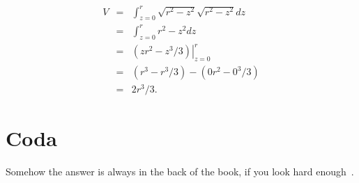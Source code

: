 \documentclass[twocolumn]{article}
\theoremstyle{definition}
\theoremstyle{plain}
\begin{document}
\begin{eqnarray*}
  V & = & \int_{z=0}^r \sqrt{r^2 - z^2} \sqrt{r^2 - z^2} dz \\
  & = & \int_{z=0}^r r^2 - z^2 dz \\
  & = & \left. (zr^2 - z^3/3) \right|_{z=0}^r \\
  & = & (r^3 - r^3/3) - (0r^2 - 0^3/3) \\
  & = & 2r^3/3.
\end{eqnarray*}

\section{Coda}

Somehow the answer is always in the back of the book, if you look hard
enough~\cite{Wikipedia-Steinmetz}.



\end{document}
